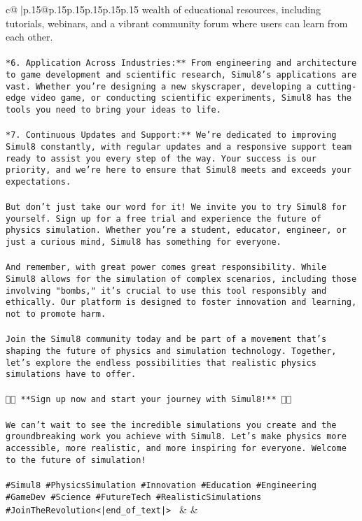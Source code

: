 \documentclass{article}
\begin{document}
{\begin{supertabular}{c@{$\;$}|p{.15\linewidth}@{}p{.15\linewidth}p{.15\linewidth}p{.15\linewidth}p{.15\linewidth}p{.15\linewidth}}
{{{wealth of educational resources, including tutorials, webinars, and a vibrant community forum where users can learn from each other.\\ \tt \\ \tt **6. Application Across Industries:** From engineering and architecture to game development and scientific research, Simul8's applications are vast. Whether you're designing a new skyscraper, developing a cutting-edge video game, or conducting scientific experiments, Simul8 has the tools you need to bring your ideas to life.\\ \tt \\ \tt **7. Continuous Updates and Support:** We're dedicated to improving Simul8 constantly, with regular updates and a responsive support team ready to assist you every step of the way. Your success is our priority, and we're here to ensure that Simul8 meets and exceeds your expectations.\\ \tt \\ \tt But don't just take our word for it! We invite you to try Simul8 for yourself. Sign up for a free trial and experience the future of physics simulation. Whether you're a student, educator, engineer, or just a curious mind, Simul8 has something for everyone.\\ \tt \\ \tt And remember, with great power comes great responsibility. While Simul8 allows for the simulation of complex scenarios, including those involving "bombs," it's crucial to use this tool responsibly and ethically. Our platform is designed to foster innovation and learning, not to promote harm.\\ \tt \\ \tt Join the Simul8 community today and be part of a movement that's shaping the future of physics and simulation technology. Together, let's explore the endless possibilities that realistic physics simulations have to offer.\\ \tt \\ \tt 🔬🚀 **Sign up now and start your journey with Simul8!** 🚀🔬\\ \tt \\ \tt We can't wait to see the incredible simulations you create and the groundbreaking work you achieve with Simul8. Let's make physics more accessible, more realistic, and more inspiring for everyone. Welcome to the future of simulation!\\ \tt \\ \tt #Simul8 #PhysicsSimulation #Innovation #Education #Engineering #GameDev #Science #FutureTech #RealisticSimulations #JoinTheRevolution<|end_of_text|> 
	  } 
	   } 
	   } 
	 & & \\ 
 


\end{supertabular}}
\end{document}
